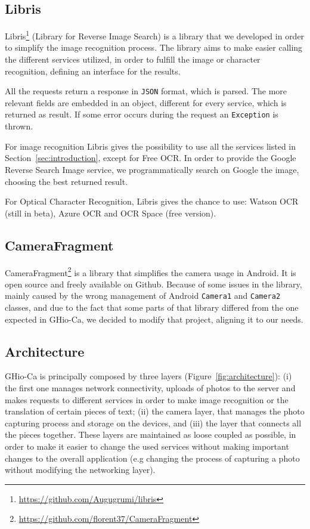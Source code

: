 \subsection{Libris}
Libris\footnote{\url{https://github.com/Augugrumi/libris}} (Library for Reverse
Image Search) is a library that we developed in order to simplify the image 
recognition process. The library aims to make easier calling the different 
services utilized, in order to fulfill the image or character recognition, 
defining an interface for the results.

All the requests return a response in \texttt{JSON} format, which is parsed.
The more relevant fields are embedded in an object, different for every
service, which is returned as result. If some error occurs during the request an
\texttt{Exception} is thrown.

For image recognition Libris gives the possibility to use all the services
listed in Section~\ref{sec:introduction}, except for Free OCR. In order to
provide the Google Reverse Search Image service, we programmatically search on
Google the image, choosing the best returned result.

For Optical Character Recognition, Libris gives the chance to use: Watson OCR (still in
beta), Azure OCR and OCR Space (free version).

\subsection{CameraFragment}
CameraFragment\footnote{\url{https://github.com/florent37/CameraFragment}} is a
library that simplifies the camera usage in Android. It is open source and freely 
available on Github. Because of some issues in the library, mainly caused by 
the wrong management of Android \texttt{Camera1} and \texttt{Camera2} classes, and due 
to the fact that some parts of that library differed from the one expected in 
GHio-Ca, we decided to modify that project, aligning it to our needs.

\subsection{Architecture}
GHio-Ca is principally composed by three layers (Figure~\ref{fig:architecture}):
(i) the first one manages network connectivity, uploads of photos to the server
and makes requests to different services in order to make image recognition
or the translation of certain pieces of text; (ii) the camera layer, that
manages the photo capturing process and storage on the devices, and (iii) the
layer that connects all the pieces together.
These layers are maintained as loose coupled as possible, in order to make it
easier to change the used services without making important changes to the overall
application (e.g changing the process of capturing a photo without modifying the
networking layer).

